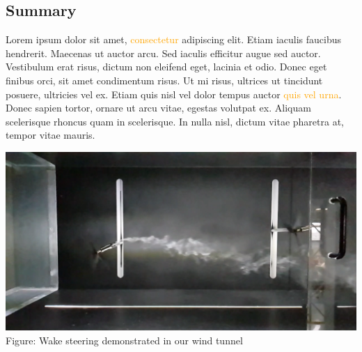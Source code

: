 \documentclass[generic]{tudposter} %
\begin{document}
\LARGE %


\setmainfont[Ligatures=TeX,Path=./fonts/,BoldItalicFont=calibrii.ttf,BoldFont=calibri.ttf,ItalicFont=calibrili.ttf]{calibril.ttf}
\begin{multicols}{2} %


\section{Summary}
Lorem ipsum dolor sit amet, \textcolor{orange}{consectetur} adipiscing elit. Etiam iaculis faucibus hendrerit. Maecenas ut auctor arcu. Sed iaculis efficitur \textcolor{tudblue}{augue sed auctor}. Vestibulum erat risus, dictum non eleifend eget, lacinia et odio. Donec eget finibus orci, sit amet condimentum risus. Ut mi risus, ultrices ut tincidunt posuere, ultricies vel ex. Etiam quis nisl vel dolor tempus auctor \textcolor{orange}{quis vel urna}. Donec sapien tortor, ornare ut arcu vitae, egestas volutpat ex. Aliquam scelerisque rhoncus quam in scelerisque. In nulla nisl, dictum vitae pharetra at, tempor \textcolor{tudblue}{vitae mauris}.\\

\begin{minipage}{\linewidth}
	\centering
	\vspace{5mm}
	\includegraphics[width=\linewidth]{images/windtunnel.png}
	{Figure: Wake steering demonstrated in our wind tunnel} %
	\vspace{1cm}
\end{minipage}


\end{multicols}
\end{document}
